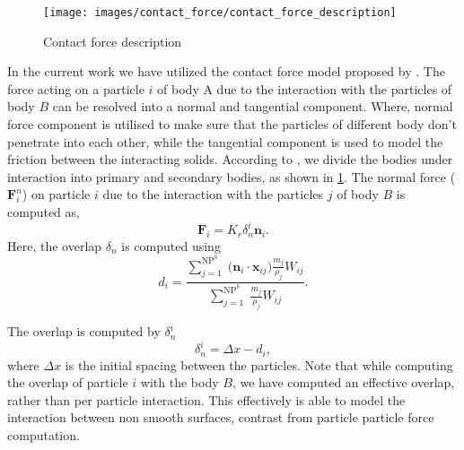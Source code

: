 \documentclass[preprint,12pt]{elsarticle}
\newcommand{\teng}[1]{\ensuremath{\boldsymbol{#1}}}
\newcommand{\ten}[1]{\ensuremath{\mathbf{#1}}}
\begin{document}
\begin{figure}[!htpb]
  \centering
  \texttt{[image: images/contact\_force/contact\_force\_description]}
  \caption{Contact force description}
\label{fig:contact_foce_description}
\end{figure}
In the current work we have utilized the contact force model proposed by
\citet{mohseni2021particle}. The force acting on a particle $i$ of body A due
to the interaction with the particles of body $B$ can be resolved into a
normal and tangential component. Where, normal force component is utilised to
make sure that the particles of different body don't penetrate into each
other, while the tangential component is used to model the friction between
the interacting solids. According to \citet{mohseni2021particle}, we divide the
bodies under interaction into primary and secondary bodies, as shown in
\cref{fig:contact_foce_description}.
The normal force ($\teng{F}_i^{n}$) on
particle $i$ due to the interaction with the particles $j$ of body $B$ is
computed as,
\begin{equation}
  \label{eq:contact-algorithm-normal}
  \ten{F}_i = K_r \delta_{n}^{i} \ten{n}_i.
\end{equation}
Here, the overlap $\delta_{n}$ is computed using
\begin{equation}
  \label{eq:cf-distance-computation}
  d_i = \frac{
    \displaystyle\sum\limits_{j = 1}^{\text{NP}^{b}} \;
    \big( \ten{n}_i \cdot \ten{x}_{ij} \big)  \frac{m_j}{\rho_j} W_{ij}}
  {
    \displaystyle\sum\limits_{j = 1}^{\text{NP}^{b}} \;
    \frac{m_j}{\rho_j} W_{ij}}.
\end{equation}

The overlap is computed by $\delta_{n}^{i}$
\begin{equation}
  \label{eq:cf-overlap}
  \delta_{n}^{i} = \Delta x - d_i,
\end{equation}
where $\Delta x$ is the initial spacing between the particles. Note that while
computing the overlap of particle $i$ with the body $B$, we have computed an
effective overlap, rather than per particle interaction. This effectively is
able to model the interaction between non smooth surfaces, contrast from
particle particle force computation.
\end{document}
